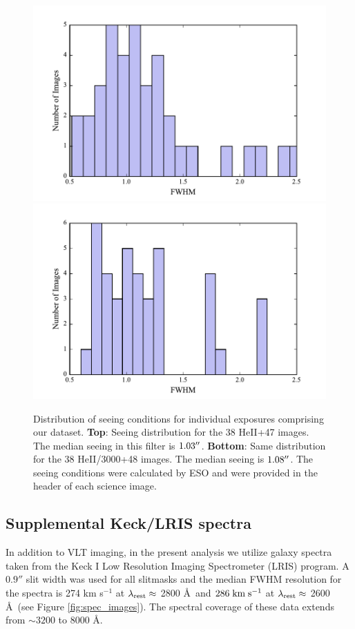\documentclass[twocolumn]{aastex61}
\def \mkms {{\rm \; km\;s^{-1}}}
\begin{document}
\begin{figure}[h]
\centering
\includegraphics[scale=.55]{../Figures/avg_seeing_HEII.pdf}
\includegraphics[scale=.55]{../Figures/avg_seeing_HEII3000.pdf}
\caption{  Distribution of seeing conditions for individual exposures comprising our dataset.
\textbf{Top}: Seeing distribution for the 38 HeII+47 images. The median seeing in this filter is $1.03\mbox{$^{\prime\prime}$}$.
\textbf{Bottom}: Same distribution for the 38 HeII/3000+48 images. The median seeing is $1.08\mbox{$^{\prime\prime}$}$. 
The seeing conditions were calculated by ESO and were provided in the header of each science image.
\label{fig.seeing}}
\end{figure}

\subsection{Supplemental Keck/LRIS spectra}
In addition to VLT imaging, in the present analysis we utilize galaxy spectra taken from the \cite{Rubin_2014} Keck I Low Resolution Imaging Spectrometer (LRIS) program.  A $0.9''$ slit width was used for all slitmasks and the median FWHM resolution for the spectra is 274 km s$^{-1}$ at $\lambda_{\rm rest} \approx$ 2800 \AA\ and $286\mkms$  at $\lambda_{\rm rest}\approx$ 2600 \AA\ (see Figure \ref{fig:spec_images}).  The spectral coverage of these data extends from ${\sim}3200$ to 8000 \AA.
\end{document}
